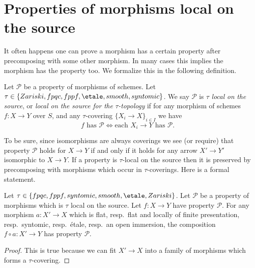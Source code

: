 \section{Properties of morphisms local on the source}
\label{section-properties-morphisms-local-source}

\noindent
It often happens one can prove a morphism has a certain property
after precomposing with some other morphism. In many cases this
implies the morphism has the property too. We formalize
this in the following definition.

\begin{definition}
\label{definition-property-morphisms-local-source}
Let $\mathcal{P}$ be a property of morphisms of schemes.
Let $\tau \in \{Zariski, \linebreak[0] fpqc, \linebreak[0] fppf, \linebreak[0]
\etale, \linebreak[0] smooth, \linebreak[0] syntomic\}$.
We say $\mathcal{P}$ is
{\it $\tau$ local on the source}, or
{\it local on the source for the $\tau$-topology} if for
any morphism of schemes $f : X \to Y$ over $S$, and any
$\tau$-covering $\{X_i \to X\}_{i \in I}$ we
have
$$
f \text{ has }\mathcal{P}
\Leftrightarrow
\text{each }X_i \to Y\text{ has }\mathcal{P}.
$$
\end{definition}

\noindent
To be sure, since isomorphisms are always coverings
we see (or require) that property $\mathcal{P}$ holds for $X \to Y$
if and only if it holds for any arrow $X' \to Y'$ isomorphic to $X \to Y$.
If a property is $\tau$-local on the source then it is preserved by
precomposing with morphisms which occur in $\tau$-coverings. Here
is a formal statement.

\begin{lemma}
\label{lemma-precompose-property-local-source}
Let $\tau \in \{fpqc, fppf, syntomic, smooth, \etale, Zariski\}$.
Let $\mathcal{P}$ be a property of morphisms which is $\tau$ local
on the source. Let $f : X \to Y$ have property $\mathcal{P}$.
For any morphism $a : X' \to X$ which is
flat, resp.\ flat and locally of finite presentation, resp.\ syntomic,
resp.\ \'etale, resp.\ an open immersion, the composition
$f \circ a : X' \to Y$ has property $\mathcal{P}$.
\end{lemma}

\begin{proof}
This is true because we can fit $X' \to X$ into a family of
morphisms which forms a $\tau$-covering.
\end{proof}

